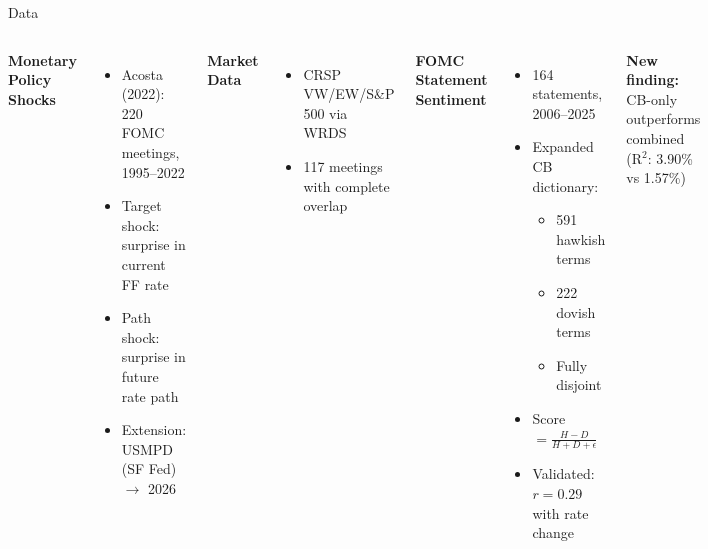 \documentclass[aspectratio=169, 11pt]{beamer}
\begin{document}
\begin{frame}{Data}
  \begin{columns}[T]
    \textbf{Monetary Policy Shocks}
    \begin{itemize}
      \item Acosta (2022): 220 FOMC meetings, 1995--2022
      \item Target shock: surprise in current FF rate
      \item Path shock: surprise in future rate path
      \item Extension: USMPD (SF Fed) $\to$ 2026
    \end{itemize}

    \vspace{0.3em}
    \textbf{Market Data}
    \begin{itemize}
      \item CRSP VW/EW/S\&P 500 via WRDS
      \item 117 meetings with complete overlap
    \end{itemize}

    \textbf{FOMC Statement Sentiment}
    \begin{itemize}
      \item 164 statements, 2006--2025
      \item Expanded CB dictionary:
        \begin{itemize}
          \item 591 hawkish terms
          \item 222 dovish terms
          \item Fully disjoint
        \end{itemize}
      \item Score $= \frac{H - D}{H + D + \epsilon}$
      \item Validated: $r = 0.29$ with rate change
    \end{itemize}

    \vspace{0.3em}
    \textbf{New finding:} CB-only outperforms combined (R$^2$: 3.90\% vs 1.57\%)
  \end{columns}
\end{frame}
\end{document}
